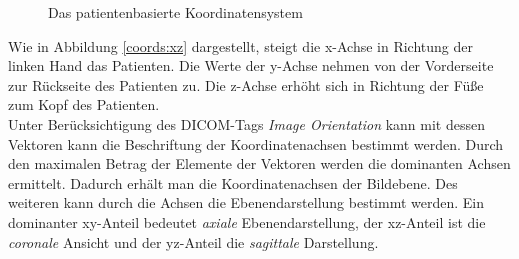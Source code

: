 \begin{figure}[htb]
\centering
{}
\caption{Das patientenbasierte Koordinatensystem}
\label{coords:both}
\end{figure}

Wie in Abbildung \ref{coords:xz} dargestellt, steigt die x-Achse in Richtung der linken Hand das Patienten. Die Werte der y-Achse nehmen von der Vorderseite zur Rückseite des Patienten zu. Die z-Achse erhöht sich in Richtung der Füße zum Kopf des Patienten\cite[C.7.6.2.1.1]{dicom:iod}.\\
Unter Berücksichtigung des DICOM-Tags \textit{Image Orientation} kann mit dessen Vektoren kann die Beschriftung der Koordinatenachsen bestimmt werden. Durch den maximalen Betrag der Elemente der Vektoren werden die dominanten Achsen ermittelt. Dadurch erhält man die Koordinatenachsen der Bildebene. Des weiteren kann durch die Achsen die Ebenendarstellung bestimmt werden. Ein dominanter xy-Anteil bedeutet \textit{axiale} Ebenendarstellung, der xz-Anteil ist die \textit{coronale} Ansicht und der yz-Anteil die \textit{sagittale} Darstellung.

